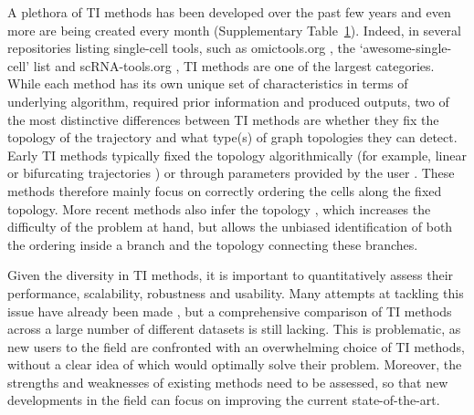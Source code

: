A plethora of TI methods has been developed over the past few years and even more are being created every month (Supplementary Table~\href{https://static-content.springer.com/esm/art\%3A10.1038\%2Fs41587-019-0071-9/MediaObjects/41587\_2019\_71\_MOESM3\_ESM.xlsx}{1}). Indeed, in several repositories listing single-cell tools, such as omictools.org \cite{henry_omictoolsinformativedirectory_2014}, the ‘awesome-single-cell’ list \cite{davis_awesomesinglecell_2018} and scRNA-tools.org \cite{zappia_exploringsinglecellrnaseq_2017}, TI methods are one of the largest categories. While each method has its own unique set of characteristics in terms of underlying algorithm, required prior information and produced outputs, two of the most distinctive differences between TI methods are whether they fix the topology of the trajectory and what type(s) of graph topologies they can detect. Early TI methods typically fixed the topology algorithmically (for example, linear \cite{bendall_singlecelltrajectorydetection_2014,schlitzer_identificationcdc1cdc2committed_2015,shin_singlecellrnaseqwaterfall_2015,campbell_bayesiangaussianprocess_2015} or bifurcating trajectories \cite{haghverdi_diffusionpseudotimerobustly_2016,setty_wishboneidentifiesbifurcating_2016}) or through parameters provided by the user \cite{trapnell_dynamicsregulatorscell_2014,matsumoto_scoupprobabilisticmodel_2016}. These methods therefore mainly focus on correctly ordering the cells along the fixed topology. More recent methods also infer the topology \cite{qiu_reversedgraphembedding_2017,street_slingshotcelllineage_2018,wolf_graphabstractionreconciles_2017}, which increases the difficulty of the problem at hand, but allows the unbiased identification of both the ordering inside a branch and the topology connecting these branches.

Given the diversity in TI methods, it is important to quantitatively assess their performance, scalability, robustness and usability. Many attempts at tackling this issue have already been made \cite{haghverdi_diffusionpseudotimerobustly_2016,ji_tscanpseudotimereconstruction_2016,welch_slicerinferringbranched_2016,matsumoto_scoupprobabilisticmodel_2016,duverle_celltreebioconductorpackage_2016,cannoodt_computationalmethodstrajectory_2016,lonnberg_singlecellrnaseqcomputational_2017,campbell_probabilisticmodelingbifurcations_2017,wolf_graphabstractionreconciles_2017}, but a comprehensive comparison of TI methods across a large number of different datasets is still lacking. This is problematic, as new users to the field are confronted with an overwhelming choice of TI methods, without a clear idea of which would optimally solve their problem. Moreover, the strengths and weaknesses of existing methods need to be assessed, so that new developments in the field can focus on improving the current state-of-the-art.

